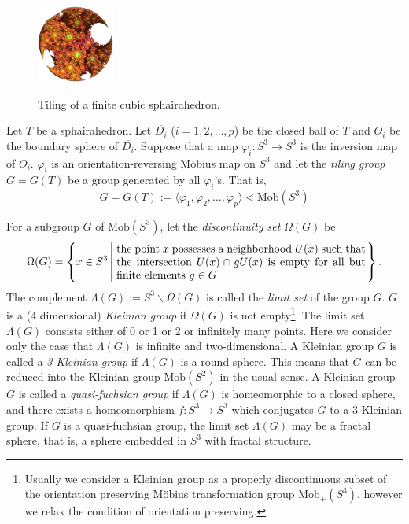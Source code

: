 \documentclass[suppldata, dvipdfmx]{interact}
\theoremstyle{plain}%
\theoremstyle{definition}
\theoremstyle{remark}
\theoremstyle{problemstyle}
\begin{document}
\begin{figure}[h!tbp]
 \hspace*{\fill}
 \begin{minipage}[t]{0.18\textwidth}
  \centering
  \includegraphics[width=1in, height=1in, keepaspectratio]{./img/constructFractal/finiteProcess/final.jpg}
  \label{fig:sphaira-final}
 \end{minipage}
 \hspace*{\fill}
 \caption{Tiling of a finite cubic sphairahedron.}
 \label{fig:sphairahedronTile}
\end{figure}

Let $T$ be a sphairahedron.  Let $\overline{D_i}$ ($i = 1,2,\ldots, p$) be the closed ball of $T$ and $O_i$ be the boundary sphere of $\overline{D_i}$.  Suppose that a map $\varphi_i:S^3 \to S^3$ is the inversion map of $O_i$.  $\varphi_i$ is an orientation-reversing M\"obius map on $S^3$ and let the {\it tiling group} $G=G(T)$ be a group generated by all $\varphi_i$'s.  That is,
\[
 G = G(T) := \langle\varphi_1, \varphi_2, \ldots , \varphi_p  \rangle < \text{Mob}(S^3)
\]

For a subgroup $G$ of
$\text{Mob}(S^3)$, let the {\it discontinuity set} $\Omega(G)$ be
\[
\Omega(G) = \left\{ x \in S^3 \left| \hspace{1mm} 
\begin{minipage}{8cm}
the point $x$ possesses a neighborhood $U(x)$
such that the intersection $U(x) \cap gU(x)$ is empty for all but finite
elements $g\in G$
\end{minipage}
 \right. \right\}.
\]
The complement $\Lambda(G) := S^3 \backslash \Omega(G)$ is called the
{\it limit set} of the group $G$. $G$ is a (4 dimensional) {\it Kleinian group} if $\Omega(G)$ is
not empty\footnote{Usually we consider a Kleinian group as a properly discontinuous subset of the orientation preserving M\"obius transformation group $\text{Mob}_+(S^3)$, however we relax the condition of orientation preserving.}. The limit set $\Lambda(G)$ consists either of 0 or 1 or 2 or
infinitely many points. Here we consider only the case that $\Lambda(G)$
is infinite and two-dimensional. 
A Kleinian group $G$ is called a
{\it 3-Kleinian group} if $\Lambda(G)$ is a round sphere. This means that $G$ can be reduced into the Kleinian group $\text{Mob}(S^2)$ in the usual sense.  
A Kleinian group $G$ is called a
{\it quasi-fuchsian group} if $\Lambda(G)$ is homeomorphic to a closed sphere, 
and there exists a homeomorphism $f:S^3 \rightarrow S^3$ which conjugates
$G$ to a 3-Kleinian group. If $G$ is a quasi-fuchsian group, the limit set
$\Lambda(G)$ may be a fractal sphere, that is, a sphere embedded in $S^3$ with
 fractal structure.
\end{document}
